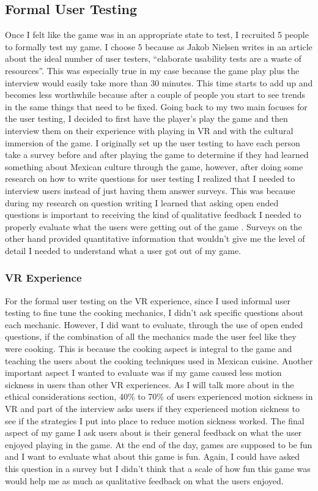 \documentclass[10pt,twocolumn]{article}
\begin{document}
\subsection{Formal User Testing}
Once I felt like the game was in an appropriate state to test, I recruited 5 people to formally test my game. I choose 5 because as Jakob Nielsen writes in an article about the ideal number of user testers, “elaborate usability tests are a waste of resources”\cite{5tester2000}. This was especially true in my case because the game play plus the interview would easily take more than 30 minutes. This time starts to add up and becomes less worthwhile because after a couple of people you start to see trends in the same things that need to be fixed. Going back to my two main focuses for the user testing, I decided to first have the player’s play the game and then interview them on their experience with playing in VR and with the cultural immersion of the game. 
I originally set up the user testing to have each person take a survey before and after playing the game to determine if they had learned something about Mexican culture through the game, however, after doing some research on how to write questions for user testing I realized that I needed to interview users instead of just having them answer surveys. This was because during my research on question writing I learned that asking open ended questions is important to receiving the kind of qualitative feedback I needed to properly evaluate what the users were getting out of the game \cite{testQues2021}. Surveys on the other hand provided quantitative information that wouldn’t give me the level of detail I needed to understand what a user got out of my game.

\subsubsection{VR Experience}
For the formal user testing on the VR experience, since I used informal user testing to fine tune the cooking mechanics, I didn't ask specific questions about each mechanic. However, I did want to evaluate, through the use of open ended questions, if the combination of all the mechanics made the user feel like they were cooking. This is because the cooking aspect is integral to the game and teaching the users about the cooking techniques used in Mexican cuisine. Another important aspect I wanted to evaluate was if my game caused less motion sickness in users than other VR experiences. As I will talk more about in the ethical considerations section, 40\% to 70\% of users experienced motion sickness in VR \cite{motionsicknessvr2019} and part of the interview asks users if they experienced motion sickness to see if the strategies I put into place to reduce motion sickness worked. The final aspect of my game I ask users about is their general feedback on what the user enjoyed playing in the game. At the end of the day, games are supposed to be fun and I want to evaluate what about this game is fun. Again, I could have asked this question in a survey but I didn’t think that a scale of how fun this game was would help me as much as qualitative feedback on what the users enjoyed.
\end{document}
